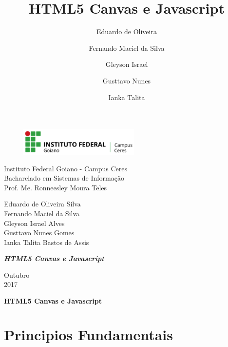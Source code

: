 \documentclass[12pt,a4paper]{article}
\title{ HTML5 Canvas e Javascript}
\author{ Eduardo de Oliveira \and Fernando Maciel da Silva \and Gleyson Israel \and Gusttavo Nunes \and Ianka Talita }
\begin{document}
\begin{titlepage}


\begin{center}
\begin{figure}[htb]
		
		\label{figura:LogoIF}
	
		\centering
		\includegraphics[width=6cm]{recursos/imagens/logo.png} 
\end{figure}


Instituto Federal Goiano - Campus Ceres\\
Bacharelado em Sistemas de Informação\\
Prof. Me. Ronneesley Moura Teles\\\vspace{0.5cm}

Eduardo de Oliveira Silva\\
Fernando Maciel da Silva\\
Gleyson Israel Alves\\
Gusttavo Nunes Gomes\\
Ianka Talita Bastos de Assis\\




\vspace{5.0cm}

\textit{\textbf{\Large{ HTML5 Canvas e Javascript}}}\\\vspace{0.5cm}
\vspace{9.5cm}

Outubro\\
2017\\
\end{center}
\end{titlepage}



\tableofcontents

\newpage
\begin{center}
\textbf{\Large{HTML5 Canvas e Javascript}}\\\vspace{0.5cm}
\end{center}

\section{Principios Fundamentais}
\end{document}
